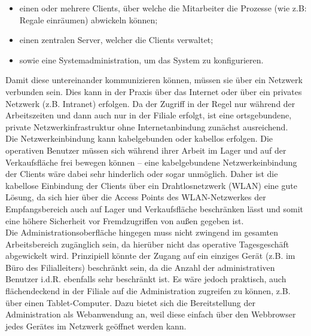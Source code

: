 \begin{itemize}
	\item einen oder mehrere Clients, über welche die Mitarbeiter die Prozesse (wie z.B: Regale einräumen) abwickeln können;
	\item einen zentralen Server, welcher die Clients verwaltet;
	\item sowie eine Systemadministration, um das System zu konfigurieren.
\end{itemize}

Damit diese untereinander kommunizieren können, müssen sie über ein Netzwerk verbunden sein. Dies kann in der Praxis über das Internet oder über ein privates Netzwerk (z.B. Intranet) erfolgen. Da der Zugriff in der Regel nur während der Arbeitszeiten und dann auch nur in der Filiale erfolgt, ist eine ortsgebundene, private Netzwerkinfrastruktur ohne Internetanbindung zunächst ausreichend.\\

Die Netzwerkeinbindung kann kabelgebunden oder kabellos erfolgen. Die operativen Benutzer müssen sich während ihrer Arbeit im Lager und auf der Verkaufsfläche frei bewegen können -- eine kabelgebundene Netzwerkeinbindung der Clients wäre dabei sehr hinderlich oder sogar unmöglich. Daher ist die kabellose Einbindung der Clients über ein Drahtlosnetzwerk (\ac{WLAN}) eine gute Lösung, da sich hier über die Access Points des \ac{WLAN}-Netzwerkes der Empfangsbereich auch auf Lager und Verkaufsfläche beschränken lässt und somit eine höhere Sicherheit vor Fremdzugriffen von außen gegeben ist.\\

Die Administrationsoberfläche hingegen muss nicht zwingend im gesamten Arbeitsbereich zugänglich sein, da hierüber nicht das operative Tagesgeschäft abgewickelt wird. Prinzipiell könnte der Zugang auf ein einziges Gerät (z.B. im Büro des Filialleiters) beschränkt sein, da die Anzahl der administrativen Benutzer i.d.R. ebenfalls sehr beschränkt ist. Es wäre jedoch praktisch, auch flächendeckend in der Filiale auf die Administration zugreifen zu können, z.B. über einen Tablet-Computer. Dazu bietet sich die Bereitstellung der Administration als Webanwendung an, weil diese einfach über den Webbrowser jedes Gerätes im Netzwerk geöffnet werden kann.

